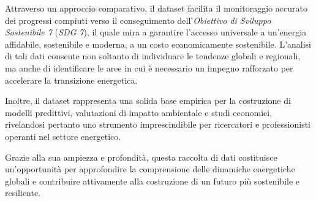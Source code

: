 Attraverso un approccio comparativo, il dataset facilita il monitoraggio accurato dei progressi compiuti verso il conseguimento dell'\textit{Obiettivo di Sviluppo Sostenibile 7} (\textit{SDG 7}), il quale mira a garantire l'accesso universale a un'energia affidabile, sostenibile e moderna, a un costo economicamente sostenibile. L'analisi di tali dati consente non soltanto di individuare le tendenze globali e regionali, ma anche di identificare le aree in cui è necessario un impegno rafforzato per accelerare la transizione energetica.

Inoltre, il dataset rappresenta una solida base empirica per la costruzione di modelli predittivi, valutazioni di impatto ambientale e studi economici, rivelandosi pertanto uno strumento imprescindibile per ricercatori e professionisti operanti nel settore energetico.

Grazie alla sua ampiezza e profondità, questa raccolta di dati costituisce un'opportunità per approfondire la comprensione delle dinamiche energetiche globali e contribuire attivamente alla costruzione di un futuro più sostenibile e resiliente.

